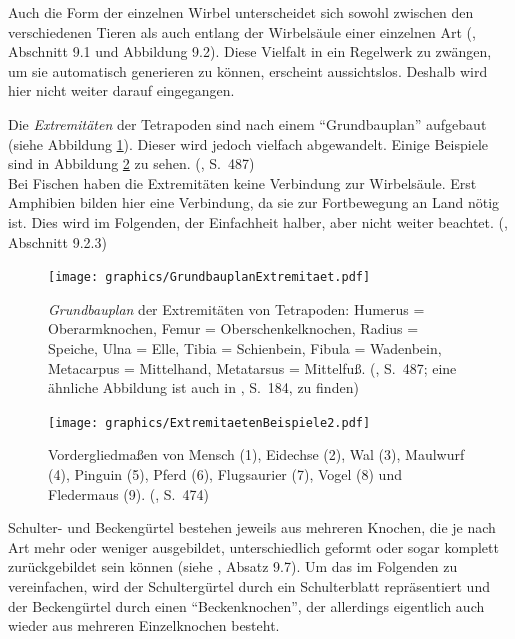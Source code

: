Auch die Form der einzelnen Wirbel unterscheidet sich sowohl zwischen den verschiedenen Tieren als auch entlang der Wirbelsäule einer einzelnen Art (\cite{Vergleichende_Anatomie}, Abschnitt 9.1 und Abbildung 9.2). Diese Vielfalt in ein Regelwerk zu zwängen, um sie automatisch generieren zu können, erscheint aussichtslos. Deshalb wird hier nicht weiter darauf eingegangen.

Die \emph{Extremitäten} der Tetrapoden sind nach einem "`Grundbauplan"' aufgebaut (siehe Abbildung \ref{grundbauplan}). Dieser wird jedoch vielfach abgewandelt. Einige Beispiele sind in Abbildung \ref{bsp_extremitaeten} zu sehen. (\cite{AllgemeineZoologie}, S.\ 487)\\
Bei Fischen haben die Extremitäten keine Verbindung zur Wirbelsäule. Erst Amphibien bilden hier eine Verbindung, da sie zur Fortbewegung an Land nötig ist. Dies wird im Folgenden, der Einfachheit halber, aber nicht weiter beachtet. (\cite{Vergleichende_Anatomie}, Abschnitt 9.2.3)

\begin{figure}
 \centering
 \texttt{[image: graphics/GrundbauplanExtremitaet.pdf]}
 \caption{\emph{Grundbauplan} der Extremitäten von Tetrapoden: Humerus = Oberarmknochen, Femur = Oberschenkelknochen, Radius = Speiche, Ulna = Elle, Tibia = Schienbein, Fibula = Wadenbein, Metacarpus = Mittelhand, Metatarsus = Mittelfuß. (\cite{AllgemeineZoologie}, S.\ 487; eine ähnliche Abbildung ist auch in \cite{Vergleichende_Anatomie}, S.\ 184, zu finden)}
 \label{grundbauplan}
\end{figure}

\begin{figure}
 \centering
 \texttt{[image: graphics/ExtremitaetenBeispiele2.pdf]}
 \caption{Vordergliedmaßen von Mensch (1), Eidechse (2), Wal (3), Maulwurf (4), Pinguin (5), Pferd (6), Flugsaurier (7), Vogel (8) und Fledermaus (9). (\cite{dtvBiologie}, S.\ 474)}
 \label{bsp_extremitaeten}
\end{figure}

Schulter- und Beckengürtel bestehen  jeweils aus mehreren Knochen, die je nach Art mehr oder weniger ausgebildet, unterschiedlich geformt oder sogar komplett zurückgebildet sein können (siehe \cite{Vergleichende_Anatomie}, Absatz 9.7). Um das im Folgenden zu vereinfachen, wird der Schultergürtel durch ein Schulterblatt repräsentiert und der Beckengürtel durch einen "`Beckenknochen"', der allerdings eigentlich auch wieder aus mehreren Einzelknochen besteht.

